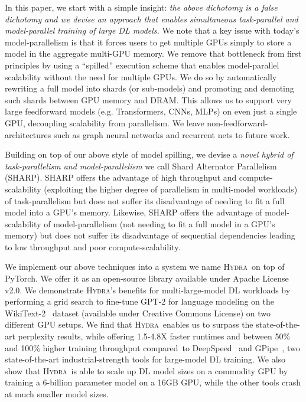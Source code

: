 \documentclass{article}
\newcommand{\system}{\textsc{Hydra}}
\begin{document}
In this paper, we start with a simple insight: \textit{the above dichotomy is a false dichotomy and we devise an approach that enables simultaneous task-parallel and model-parallel training of large DL models.}
We note that a key issue with today's model-parallelism is that it forces users to get multiple GPUs simply to store a model in the aggregate multi-GPU memory. We remove that bottleneck from first principles by using a ``spilled'' execution scheme that enables model-parallel scalability without the need for multiple GPUs. We do so by automatically rewriting a full model into shards (or sub-models) and promoting and demoting such shards between GPU memory and DRAM. This allows us to support very large feedforward models (e.g. Transformers, CNNs, MLPs) on even just a single GPU, decoupling scalability from parallelism. We leave non-feedforward-architectures such as graph neural networks and recurrent nets to future work.

Building on top of our above style of model spilling, we devise a \textit{novel hybrid of task-parallelism and model-parallelism} we call Shard Alternator Parallelism (SHARP). SHARP offers the advantage of high throughput and compute-scalability (exploiting the higher degree of parallelism in multi-model workloads) of task-parallelism but does not suffer its disadvantage of needing to fit a full model into a GPU's memory. Likewise, SHARP offers the advantage of model-scalability of model-parallelism (not needing to fit a full model in a GPU's memory) but does not suffer its disadvantage of sequential dependencies leading to low throughput and poor compute-scalability.

We implement our above techniques into a system we name \system~on top of PyTorch. We offer it as an open-source library available under Apache License v2.0. We demonstrate \system's benefits for multi-large-model DL workloads by performing a grid search to fine-tune GPT-2 for language modeling on the WikiText-2~\cite{wikitext2} dataset (available under Creative Commons License) on two different GPU setups. We find that \system~enables us to surpass the state-of-the-art perplexity results, while offering 1.5-4.8X faster runtimes and between 50\% and 100\% higher training throughput compared to DeepSpeed~\cite{zeroDeep,zeroOpt,zeroInfinity} and GPipe~\cite{gpipe}, two state-of-the-art industrial-strength tools for large-model DL training. We also show that \system~is able to scale up DL model sizes on a commodity GPU by training a 6-billion parameter model on a 16GB GPU, while the other tools crash at much smaller model sizes.
\end{document}
